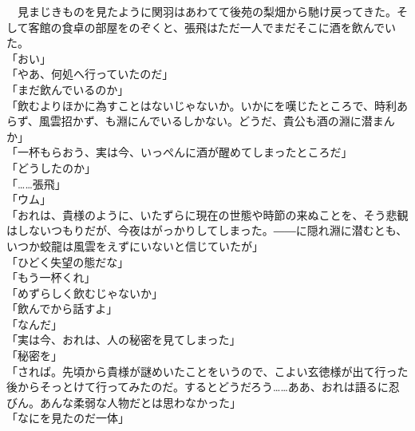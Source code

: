 \documentclass[
  paper=a5,
  fontsize=10pt,
  jafontsize=9.5pt,
  tate,                  %
  open_bracket_pos=nibu, %
]{jlreq}
\begin{document}
　見まじきものを見たように関羽はあわてて後苑の梨畑から馳け戻ってきた。そして客館の食卓の部屋をのぞくと、張飛はただ一人でまだそこに酒を飲んでいた。\\


「おい」\\


「やあ、何処へ行っていたのだ」\\


「まだ飲んでいるのか」\\


「飲むよりほかに為すことはないじゃないか。いかにを嘆じたところで、時利あらず、風雲招かず、も淵にんでいるしかない。どうだ、貴公も酒の淵に潜まんか」\\


「一杯もらおう、実は今、いっぺんに酒が醒めてしまったところだ」\\


「どうしたのか」\\


「……張飛」\\


「ウム」\\


「おれは、貴様のように、いたずらに現在の世態や時節の来ぬことを、そう悲観はしないつもりだが、今夜はがっかりしてしまった。――に隠れ淵に潜むとも、いつか蛟龍は風雲をえずにいないと信じていたが」\\


「ひどく失望の態だな」\\


「もう一杯くれ」\\


「めずらしく飲むじゃないか」\\


「飲んでから話すよ」\\


「なんだ」\\


「実は今、おれは、人の秘密を見てしまった」\\


「秘密を」\\


「されば。先頃から貴様が謎めいたことをいうので、こよい玄徳様が出て行った後からそっとけて行ってみたのだ。するとどうだろう……ああ、おれは語るに忍びん。あんな柔弱な人物だとは思わなかった」\\


「なにを見たのだ一体」\\
\end{document}
